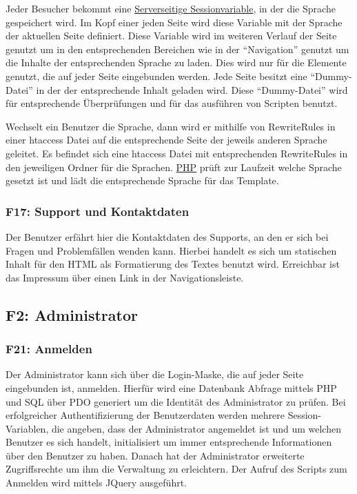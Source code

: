 \documentclass[10pt,a4paper]{scrartcl}
\begin{document}
Jeder Besucher bekommt eine \underline{Serverseitige Sessionvariable}, in der die Sprache gespeichert wird. Im Kopf einer jeden Seite wird diese Variable mit der Sprache der aktuellen Seite definiert. Diese Variable wird im weiteren Verlauf der Seite genutzt um in den entsprechenden Bereichen wie in der "`Navigation"' genutzt um die Inhalte der entsprechenden Sprache zu laden. Dies wird nur f\"ur die Elemente genutzt, die auf jeder Seite eingebunden werden. Jede Seite besitzt eine "`Dummy-Datei"' in der der entsprechende Inhalt geladen wird. Diese "`Dummy-Datei"' wird f\"ur entsprechende \"Uberpr\"ufungen und f\"ur das ausf\"uhren von Scripten benutzt.

Wechselt ein Benutzer die Sprache, dann wird er mithilfe von RewriteRules in einer htaccess Datei auf die entsprechende Seite der jeweils anderen Sprache geleitet. Es befindet sich eine htaccess Datei mit entsprechenden RewriteRules in den jeweiligen Ordner f\"ur die Sprachen.  \underline{PHP} pr\"uft zur Laufzeit welche Sprache gesetzt ist und l\"adt die entsprechende Sprache f\"ur das Template.

\subsubsection*{F17: Support und Kontaktdaten}

Der Benutzer erfährt hier die Kontaktdaten des Supports, an den er sich bei Fragen und Problemfällen wenden kann. Hierbei handelt es sich um statischen Inhalt für den HTML als Formatierung des Textes benutzt wird. Erreichbar ist das Impressum über einen Link in der Navigationsleiste.


\subsection{F2: Administrator}
\subsubsection*{F21: Anmelden}

Der Administrator kann sich über die Login-Maske, die auf jeder Seite eingebunden ist, anmelden. Hierfür wird eine Datenbank Abfrage mittels PHP und SQL über PDO generiert um die Identität des Administrator zu prüfen. Bei erfolgreicher Authentifizierung der Benutzerdaten werden mehrere Session-Variablen, die angeben, dass der Administrator angemeldet ist und um welchen Benutzer es sich handelt, initialisiert um immer entsprechende Informationen über den Benutzer zu haben. Danach hat der Administrator erweiterte Zugriffsrechte um ihm die Verwaltung zu erleichtern. Der Aufruf des Scripts zum Anmelden wird mittels JQuery ausgef\"uhrt.
\end{document}
